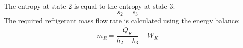 The entropy at state 2 is equal to the entropy at state 3:  
\[
s_2 = s_3
\]  
The required refrigerant mass flow rate is calculated using the energy balance:  
\[
\dot{m}_R = \frac{\dot{Q}_K}{h_2 - h_3} + \dot{W}_K
\]